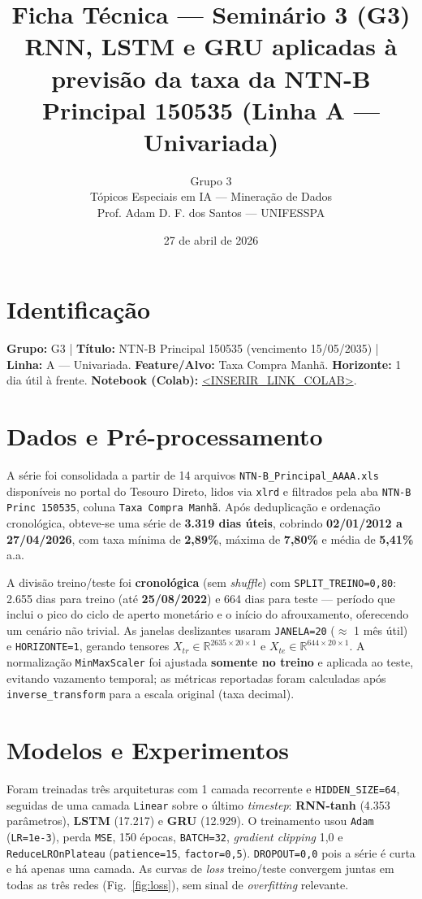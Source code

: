 \documentclass[11pt,a4paper]{article}
\title{\vspace{-1.5cm}\textbf{Ficha Técnica --- Seminário 3 (G3)}\\[2pt]
\large RNN, LSTM e GRU aplicadas à previsão da taxa da NTN-B Principal 150535 (Linha A --- Univariada)}
\author{Grupo 3 \\ \small Tópicos Especiais em IA --- Mineração de Dados \\ \small Prof. Adam D. F. dos Santos --- UNIFESSPA}
\date{27 de abril de 2026}
\begin{document}
\maketitle
\vspace{-0.6cm}

\section{Identificação}
\textbf{Grupo:} G3 \quad | \quad \textbf{Título:} NTN-B Principal 150535 (vencimento 15/05/2035) \quad | \quad \textbf{Linha:} A --- Univariada. \textbf{Feature/Alvo:} Taxa Compra Manhã. \textbf{Horizonte:} 1 dia útil à frente. \textbf{Notebook (Colab):} \url{<INSERIR_LINK_COLAB>}.

\section{Dados e Pré-processamento}
A série foi consolidada a partir de 14 arquivos \texttt{NTN-B\_Principal\_AAAA.xls} disponíveis no portal do Tesouro Direto, lidos via \texttt{xlrd} e filtrados pela aba \texttt{NTN-B Princ 150535}, coluna \texttt{Taxa Compra Manhã}. Após deduplicação e ordenação cronológica, obteve-se uma série de \textbf{3.319 dias úteis}, cobrindo \textbf{02/01/2012 a 27/04/2026}, com taxa mínima de \textbf{2,89\%}, máxima de \textbf{7,80\%} e média de \textbf{5,41\%} a.a.

A divisão treino/teste foi \textbf{cronológica} (sem \emph{shuffle}) com \texttt{SPLIT\_TREINO=0,80}: 2.655 dias para treino (até \textbf{25/08/2022}) e 664 dias para teste --- período que inclui o pico do ciclo de aperto monetário e o início do afrouxamento, oferecendo um cenário não trivial. As janelas deslizantes usaram \texttt{JANELA=20} ($\approx$ 1 mês útil) e \texttt{HORIZONTE=1}, gerando tensores $X_{tr} \in \mathbb{R}^{2635\times 20\times 1}$ e $X_{te} \in \mathbb{R}^{644\times 20\times 1}$. A normalização \texttt{MinMaxScaler} foi ajustada \textbf{somente no treino} e aplicada ao teste, evitando vazamento temporal; as métricas reportadas foram calculadas após \texttt{inverse\_transform} para a escala original (taxa decimal).

\section{Modelos e Experimentos}
Foram treinadas três arquiteturas com 1 camada recorrente e \texttt{HIDDEN\_SIZE=64}, seguidas de uma camada \texttt{Linear} sobre o último \emph{timestep}: \textbf{RNN-tanh} (4.353 parâmetros), \textbf{LSTM} (17.217) e \textbf{GRU} (12.929). O treinamento usou \texttt{Adam} (\texttt{LR=1e-3}), perda \texttt{MSE}, 150 épocas, \texttt{BATCH=32}, \emph{gradient clipping} 1,0 e \texttt{ReduceLROnPlateau} (\texttt{patience=15}, \texttt{factor=0,5}). \texttt{DROPOUT=0,0} pois a série é curta e há apenas uma camada. As curvas de \emph{loss} treino/teste convergem juntas em todas as três redes (Fig.~\ref{fig:loss}), sem sinal de \emph{overfitting} relevante.
\end{document}
